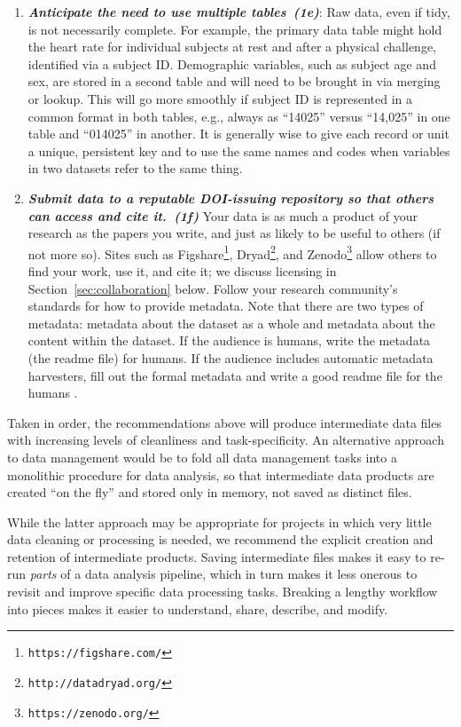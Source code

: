 \documentclass[10pt,letterpaper]{article}
\newcommand{\withurl}[2]{{#1}\footnote{{\texttt{#2}}}}
\newcommand{\practice}[2]{\textbf{\emph{{#2}~({#1})}}}
\begin{document}
\begin{enumerate}
\item
  \practice{1e}{Anticipate the need to use multiple tables}: Raw data, even if tidy, is not
  necessarily complete. For example, the primary data table might hold the heart rate for
  individual subjects at rest and after a physical challenge, identified via a subject ID.
  Demographic variables, such as subject age and sex, are stored in a second table and
  will need to be brought in via merging or lookup. This will go more smoothly if subject
  ID is represented in a common format in both tables, e.g., always as ``14025'' versus
  ``14,025'' in one table and ``014025'' in another. It is generally wise to give each
  record or unit a unique, persistent key and to use the same names and codes when
  variables in two datasets refer to the same thing.

\item
  \practice{1f}{Submit data to a reputable DOI-issuing repository so that
    others can access and cite it.}  Your data is as much a product of
  your research as the papers you write, and just as likely to be
  useful to others (if not more so).  Sites such as
  \withurl{Figshare}{https://figshare.com/},
  \withurl{Dryad}{http://datadryad.org/}, and
  \withurl{Zenodo}{https://zenodo.org/} allow others to find your work,
  use it, and cite it; we discuss licensing in
  Section~\ref{sec:collaboration} below. Follow your research community's
  standards for how to provide metadata. Note that there are two types
  of metadata: metadata about the dataset as a whole and metadata about
  the content within the dataset. If the audience is humans, write the
  metadata (the readme file) for humans. If the audience includes automatic
  metadata harvesters, fill out the formal metadata and write a good
  readme file for the humans \cite{wickes2015}.

\end{enumerate}

Taken in order, the recommendations above will produce intermediate
data files with increasing levels of cleanliness and
task-specificity. An alternative approach to data management would be
to fold all data management tasks into a monolithic procedure for data analysis,
so that intermediate data products are created ``on the fly'' and stored only in
memory, not saved as distinct files.

While the latter approach may be appropriate for projects in which very
little data cleaning or processing is needed, we recommend the explicit
creation and retention of intermediate products. Saving intermediate
files makes it easy to re-run \emph{parts} of a data analysis pipeline,
which in turn makes it less onerous to revisit and improve specific data
processing tasks. Breaking a lengthy workflow into pieces makes it
easier to understand, share, describe, and modify.
\end{document}
